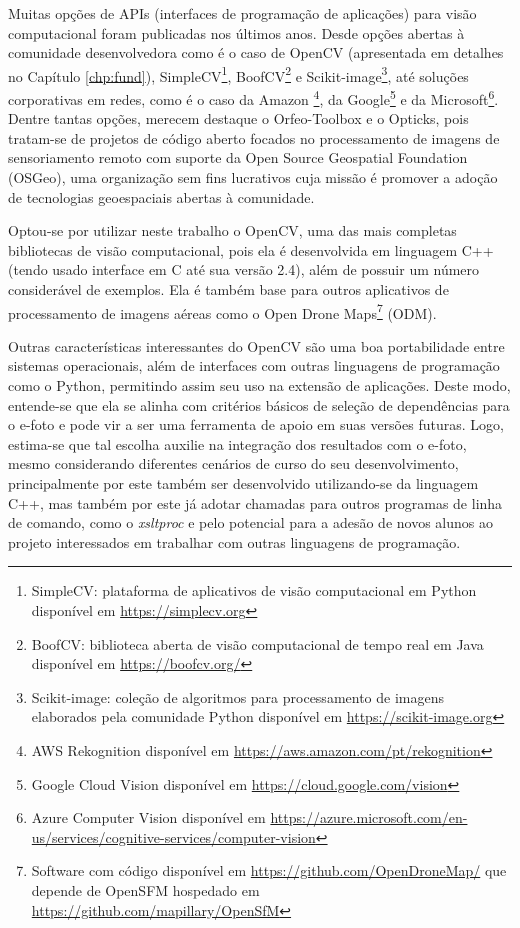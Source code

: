 Muitas opções de APIs (interfaces de programação de aplicações) para visão computacional foram publicadas nos últimos anos. Desde opções abertas à comunidade desenvolvedora como é o caso de 
OpenCV (apresentada em detalhes no Capítulo \ref{chp:fund}),
SimpleCV\footnote{SimpleCV: plataforma de aplicativos de visão computacional em Python disponível em \url{https://simplecv.org}},
BoofCV\footnote{BoofCV: biblioteca aberta de visão computacional de tempo real em Java disponível em \url{https://boofcv.org/}} e
Scikit-image\footnote{Scikit-image: coleção de algoritmos para processamento de imagens elaborados pela comunidade Python disponível em \url{https://scikit-image.org}},
até soluções corporativas em redes, como é o caso da Amazon 
\footnote{AWS Rekognition disponível em \url{https://aws.amazon.com/pt/rekognition}}, 
da Google\footnote{Google Cloud Vision disponível em \url{https://cloud.google.com/vision}}
e da Microsoft\footnote{Azure Computer Vision disponível em \url{https://azure.microsoft.com/en-us/services/cognitive-services/computer-vision}}.
Dentre tantas opções, merecem destaque o Orfeo-Toolbox e o Opticks, pois tratam-se de projetos de código aberto focados no processamento de imagens de sensoriamento remoto com suporte da Open Source Geospatial Foundation (OSGeo), uma organização sem fins lucrativos cuja missão é promover a adoção de tecnologias geoespaciais abertas à comunidade. 

Optou-se por utilizar neste trabalho o OpenCV, uma das mais completas bibliotecas de visão computacional, pois ela é desenvolvida em linguagem C++ (tendo usado interface em C até sua versão 2.4), além de possuir um número considerável de exemplos. Ela é também base para outros aplicativos de processamento de imagens aéreas como o 
Open Drone Maps\footnote{Software com código disponível em \url{https://github.com/OpenDroneMap/} que depende de OpenSFM hospedado em \url{https://github.com/mapillary/OpenSfM}} (ODM).

Outras características interessantes do OpenCV são uma boa portabilidade entre sistemas operacionais, além de interfaces com outras linguagens de programação como o Python, permitindo assim seu uso na extensão de aplicações. Deste modo, entende-se que ela se alinha com critérios básicos de seleção de dependências para o e-foto e pode vir a ser uma ferramenta de apoio em suas versões futuras. Logo, estima-se que tal escolha auxilie na integração dos resultados com o e-foto, mesmo considerando diferentes cenários de curso do seu desenvolvimento, principalmente por este também ser desenvolvido utilizando-se da linguagem C++, mas também por este já adotar chamadas para outros programas de linha de comando, como o \textit{xsltproc} \cite{jonas2012} e pelo potencial para a adesão de novos alunos ao projeto interessados em trabalhar com outras linguagens de programação.

